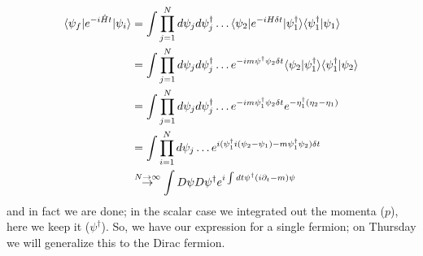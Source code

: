 \begin{equation}
    \begin{split}
        \langle \psi_f \rvert e^{-i\hat{H}t}\lvert \psi_i \rangle &= \int \prod_{j=1}^N d\psi_j d\psi_j^\dagger \ldots \langle \psi_2 \rvert e^{-iH\delta t}\lvert \psi_1^\dagger \rangle\langle \psi_1^\dagger \lvert \psi_1 \rangle
        \\ &=  \int \prod_{j=1}^N d\psi_j d\psi_j^\dagger \ldots e^{-im\psi^\dagger \psi_2 \delta t}\langle \psi_2 \lvert \psi_1^\dagger \rangle\langle \psi_1^\dagger \lvert \psi_2 \rangle
        \\ &= \int \prod_{j=1}^N d\psi_j d\psi_j^\dagger \ldots e^{-im\psi^\dagger_1 \psi_2 \delta t}e^{-\eta_1^\dagger(\eta_2 - \eta_1)}
        \\ &= \int \prod_{i=1}^N d\psi_j \ldots e^{i(\psi_1^\dagger i(\psi_2 - \psi_1) - m\psi_1^\dagger \psi_2)\delta t}
        \\ &\stackrel{N\to\infty}{\to} \int D\psi D\psi^\dagger e^{i\int dt \psi^\dagger (i\partial_t - m)\psi}
    \end{split}
\end{equation}
and in fact we are done; in the scalar case we integrated out the momenta ($p$), here we keep it ($\psi^\dag$). So, we have our expression for a single fermion; on Thursday we will generalize this to the Dirac fermion.